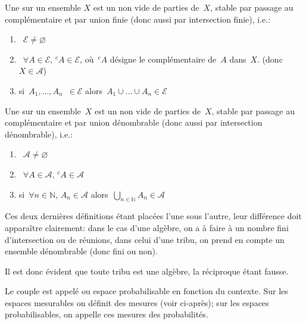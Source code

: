 \medskip
\begin{definition}[Algèbre]
Une  sur un ensemble $X$ est un  non vide de parties de~$X$, stable par passage au complémentaire et par union finie (donc aussi par intersection finie), i.e.:
\begin{enumerate}
 \item~$\mathcal{E} \not=\varnothing$
 \item~$\forall A \in \mathcal{E}$, ${}^c A \in\mathcal{E}$, où~${}^cA$ désigne le complémentaire de~$A$ dans~$X$.
	(donc~$X\in \mathcal{A}$)
\item si~$A_1,\ldots,A_n$~$\in\mathcal{E}$ alors~$A_1\cup ...\cup A_n \in\mathcal{E}$
\end{enumerate}
\end{definition}

\medskip
\begin{definition}[Tribu]\label{Def-tribu}
Une  sur un ensemble~$X$ est un  non vide de parties de~$X$, stable par passage au complémentaire et par union dénombrable (donc aussi par intersection dénombrable), i.e.:
\begin{enumerate}
 \item~$\mathcal{A} \not=\varnothing$
 \item~$\forall A \in \mathcal{A}$, ${}^c A \in\mathcal{A}$%
\item si~$\forall n \in \mathbb{N}$, $A_n \in\mathcal{A}$ alors~$\bigcup_{n\in\mathbb{N}} A_n \in\mathcal{A}$
\end{enumerate}
\end{definition}

Ces deux dernières définitions étant placées l'une sous l'autre, leur différence doit apparaître clairement: dans le cas d'une algèbre, on a à faire à un nombre fini d'intersection ou de réunions, dans celui d'une tribu, on prend en compte un ensemble dénombrable (donc fini ou non).

\medskip
Il est donc évident que toute tribu est une algèbre, la réciproque étant fausse.

\begin{definition}
Le couple  est appelé  ou espace probabilisable en fonction du contexte.
Sur les espaces mesurables on définit des mesures (voir ci-après); sur les espaces probabilisables, on appelle ces mesures des probabilités.
\end{definition}

